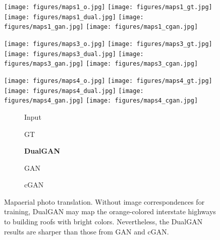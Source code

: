 \begin{figure}
\begin{center}
\texttt{[image: figures/maps1\_o.jpg]}
\texttt{[image: figures/maps1\_gt.jpg]}
\texttt{[image: figures/maps1\_dual.jpg]}
\texttt{[image: figures/maps1\_gan.jpg]}
\texttt{[image: figures/maps1\_cgan.jpg]}



\texttt{[image: figures/maps3\_o.jpg]}
\texttt{[image: figures/maps3\_gt.jpg]}
\texttt{[image: figures/maps3\_dual.jpg]}
\texttt{[image: figures/maps3\_gan.jpg]}
\texttt{[image: figures/maps3\_cgan.jpg]}

\texttt{[image: figures/maps4\_o.jpg]}
\texttt{[image: figures/maps4\_gt.jpg]}
\texttt{[image: figures/maps4\_dual.jpg]}
\texttt{[image: figures/maps4\_gan.jpg]}
\texttt{[image: figures/maps4\_cgan.jpg]}

\begin{subfigure}[]{0.19\linewidth}\caption*{Input}\end{subfigure}
\begin{subfigure}[]{0.19\linewidth}\caption*{GT}\end{subfigure}
\begin{subfigure}[]{0.19\linewidth}\caption*{\textbf{DualGAN}}\end{subfigure}
\begin{subfigure}[]{0.19\linewidth}\caption*{GAN}\end{subfigure}
\begin{subfigure}[]{0.19\linewidth}\caption*{cGAN~\cite{isola2016image}}\end{subfigure}
\caption{Mapaerial photo translation. Without image correspondences for training, 
DualGAN may map the orange-colored interstate highways to building roofs with bright colors. 
Nevertheless, the DualGAN results are sharper than those from GAN and cGAN.}
\label{fig:maps}
\end{center}
\end{figure}



